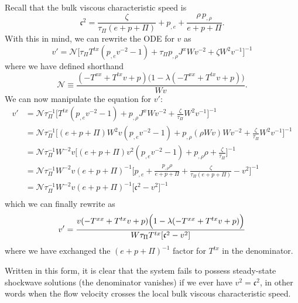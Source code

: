 \documentclass[12pt]{article}
\numberwithin{equation}{section}
\begin{document}
Recall that the bulk viscous characteristic speed is \cite{Bemfica19}
\begin{equation}
\mathfrak{c}^2 = \frac{\zeta}{\tau_{\Pi} (e + p + \Pi)} + p_{,e} + \frac{\rho \, p_{,\rho}}{e + p + \Pi}.
\end{equation}
With this in mind, we can rewrite the ODE for $v$ as
\begin{equation}
v' = \mathcal{N} \Big[ \tau_{\Pi} T^{tx} ( p_{,e} v^{-2} - 1) + \tau_{\Pi} p_{,\rho} J^x W v^{-2} + \zeta W^2 v^{-1} \Big]^{-1}
\end{equation}
where we have defined shorthand
\begin{equation}
\mathcal{N} \equiv \frac{(-T^{xx} + T^{tx} v + p) \Big( 1 - \lambda (-T^{xx} + T^{tx} v + p) \Big)}{W v}.
\end{equation}
We can now manipulate the equation for $v'$:
\begin{equation}
\begin{aligned}
v' &= \mathcal{N} \tau_{\Pi}^{-1} \Big[ T^{tx} ( p_{,e} v^{-2} - 1) + p_{,\rho} J^x W v^{-2} + \frac{\zeta}{\tau_{\Pi}} W^2 v^{-1} \Big]^{-1} \\
&= \mathcal{N} \tau_{\Pi}^{-1} \Big[ (e + p + \Pi) W^2 v ( p_{,e} v^{-2} - 1) + p_{,\rho} (\rho W v) W v^{-2} + \frac{\zeta}{\tau_{\Pi}} W^2 v^{-1} \Big]^{-1} \\
&= \mathcal{N} \tau_{\Pi}^{-1} W^{-2} v \Big[ (e + p + \Pi) v^2 ( p_{,e} v^{-2} - 1) + p_{,\rho} \rho + \frac{\zeta}{\tau_{\Pi}} \Big]^{-1} \\
&= \mathcal{N} \tau_{\Pi}^{-1} W^{-2} v (e + p + \Pi)^{-1} \Big[ p_{,e} + \frac{p_{,\rho} \rho}{e + p + \Pi} + \frac{\zeta}{\tau_{\Pi} (e + p + \Pi)} - v^2 \Big]^{-1} \\
&= \mathcal{N} \tau_{\Pi}^{-1} W^{-2} v (e + p + \Pi)^{-1} \Big[ \mathfrak{c}^2 - v^2 \Big]^{-1} \\
\end{aligned}
\end{equation}
which we can finally rewrite as
\begin{equation}
v' = \frac{v (-T^{xx} + T^{tx} v + p) \Big( 1 - \lambda (-T^{xx} + T^{tx} v + p) \Big)}{W \tau_{\Pi} T^{tx} [ \mathfrak{c}^2 - v^2 ]} \\
\end{equation}
where we have exchanged the $(e + p + \Pi)^{-1}$ factor for $T^{tx}$ in the denominator.

Written in this form, it is clear that the system fails to possess steady-state shockwave solutions (the denominator vanishes) if we ever have $v^2 = \mathfrak{c}^2$, in other words when the flow velocity crosses the local bulk viscous characteristic speed.
\end{document}
